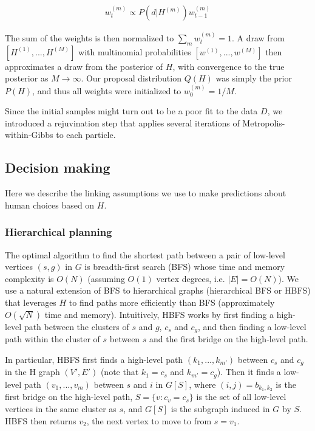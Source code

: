 \documentclass[11pt]{article}
\begin{document}
\begin{align}
    w^{(m)}_t \propto P(d|H^{(m)}) w^{(m)}_{t-1}
\end{align}

The sum of the weights is then normalized to $\sum_m w^{(m)}_t = 1$. A draw from $[H^{(1)}, ..., H^{(M)}]$ with multinomial probabilities $[w^{(1)}, ..., w^{(M)}]$ then approximates a draw from the posterior of $H$, with convergence to the true posterior as $M \rightarrow \infty$. Our proposal distribution $Q(H)$ was simply the prior $P(H)$, and thus all weights were initialized to $w^{(m)}_0 = 1/M$.

Since the initial samples might turn out to be a poor fit to the data $D$, we introduced a rejuvination step \cite{chopin2002sequential} that applies several iterations of Metropolis-within-Gibbs to each particle.



\subsection{Decision making}

Here we describe the linking assumptions we use to make predictions about human choices based on $H$.

\subsubsection{Hierarchical planning}

The optimal algorithm to find the shortest path between a pair of low-level vertices $(s,g)$ in $G$ is breadth-first search (BFS) \cite{cormen2009introduction} whose time and memory complexity is $O(N)$ (assuming $O(1)$ vertex degrees, i.e. $|E| = O(N)$). We use a natural extension of BFS to hierarchical graphs \cite{fernandez2013multi} (hierarchical BFS or HBFS) that leverages $H$ to find paths more efficiently than BFS (approximately $O(\sqrt{N})$ time and memory). Intuitively, HBFS works by first finding a high-level path between the clusters of $s$ and $g$, $c_s$ and $c_g$, and then finding a low-level path within the cluster of $s$ between $s$ and the first bridge on the high-level path.

In particular, HBFS first finds a high-level path $(k_1, ..., k_{m'})$ between $c_s$ and $c_g$ in the H graph $(V', E')$ (note that $k_1 = c_s$ and $k_{m'} = c_g$). Then it finds a low-level path $(v_1, ..., v_m)$ between $s$ and $i$ in $G[S]$, where $(i,j) = b_{k_1, k_2}$ is the first bridge on the high-level path, $S = \{v : c_v = c_s\}$ is the set of all low-level vertices in the same cluster as $s$, and $G[S]$ is the subgraph induced in $G$ by $S$. HBFS then returns $v_2$, the next vertex to move to from $s = v_1$.
\end{document}
